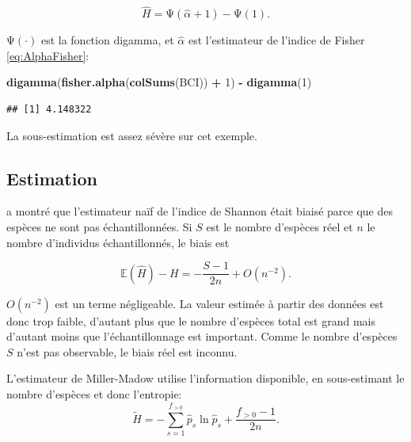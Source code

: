 \documentclass[
  11pt,
  american,
  a4paper,
  extrafontsizes,onecolumn,openright
  ]{memoir}
\newenvironment{Shaded}{\begin{snugshade}}{\end{snugshade}}
\newcommand{\DecValTok}[1]{\textcolor[rgb]{0.00,0.00,0.81}{#1}}
\newcommand{\FunctionTok}[1]{\textcolor[rgb]{0.13,0.29,0.53}{\textbf{#1}}}
\newcommand{\NormalTok}[1]{#1}
\newcommand{\SpecialCharTok}[1]{\textcolor[rgb]{0.81,0.36,0.00}{\textbf{#1}}}
\begin{document}
\begin{equation}
  \label{eq:Bulmer1974}
  \hat{H} 
  = \mathrm{\Psi} \left( \hat{\alpha} + 1 \right) - \mathrm{\Psi} \left( 1 \right).
\end{equation}

\(\mathrm{\Psi}(\cdot)\) est la fonction digamma, et \(\hat{\alpha}\) est l'estimateur de l'indice de Fisher \eqref{eq:AlphaFisher}:

\scriptsize

\begin{Shaded}
\begin{Highlighting}[]
\FunctionTok{digamma}\NormalTok{(}\FunctionTok{fisher.alpha}\NormalTok{(}\FunctionTok{colSums}\NormalTok{(BCI)) }\SpecialCharTok{+} \DecValTok{1}\NormalTok{) }\SpecialCharTok{{-}} \FunctionTok{digamma}\NormalTok{(}\DecValTok{1}\NormalTok{)}
\end{Highlighting}
\end{Shaded}

\begin{verbatim}
## [1] 4.148322
\end{verbatim}

\normalsize

La sous-estimation est assez sévère sur cet exemple.

\subsection{Estimation}\label{sec-BiaisShannon}

\textcite{Basharin1959} a montré que l'estimateur naïf de l'indice de Shannon était biaisé parce que des espèces ne sont pas échantillonnées.
Si \(S\) est le nombre d'espèces réel et \(n\) le nombre d'individus échantillonnés, le biais est

\begin{equation}
  \label{eq:Basharin1959}
  \mathbb{E}\left( \hat{H} \right) - H 
  = -\frac{S - 1}{2n} + O\left(n^{-2}\right).
\end{equation}

\(O(n^{-2})\) est un terme négligeable.
La valeur estimée à partir des données est donc trop faible, d'autant plus que le nombre d'espèces total est grand mais d'autant moins que l'échantillonnage est important.
Comme le nombre d'espèces \(S\) n'est pas observable, le biais réel est inconnu.

L'estimateur de Miller-Madow \autocite{Miller1955} utilise l'information disponible, en sous-estimant le nombre d'espèces et donc l'entropie:
\begin{equation}
  \label{eq:MillerMadow}
  \tilde{H} = -\sum^{f_{>0}}_{s=1}{\hat{p}_s \ln{\hat{p}_s}} + \frac{f_{>0} - 1}{2n}.
\end{equation}
\end{document}
